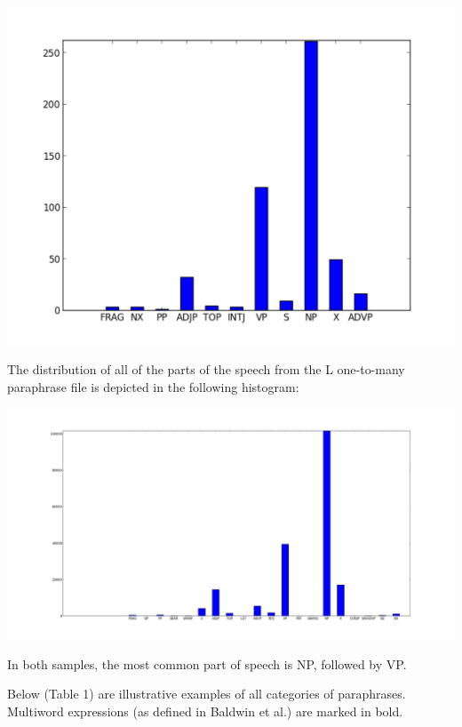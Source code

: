 \documentclass[11pt]{article}
\begin{document}
\begin{center}
\includegraphics[width=150mm]{figs/random_sample_pos_histogram_500.pdf}
\end{center}

The distribution of all of the parts of the speech from the L one-to-many paraphrase file is depicted in the following histogram:

\begin{center}
\includegraphics[width=175mm]{figs/random_sample_pos_histogram_all.pdf}
\end{center}

In both samples, the most common part of speech is NP, followed by VP. 

Below (Table 1) are illustrative examples of all categories of paraphrases. Multiword expressions (as defined in Baldwin et al.) are marked in bold.
\end{document}
